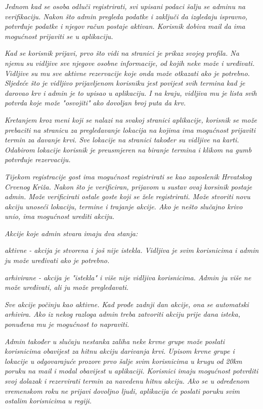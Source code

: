 		\textit{Jednom kad se osoba odluči registrirati, svi upisani podaci šalju se adminu na verifikaciju. Nakon što admin pregleda podatke i zaključi da izgledaju ispravno, potvrđuje podatke i njegov račun postaje aktivan. Korisnik dobiva mail da ima mogućnost prijaviti se u aplikaciju. }

		\textit{Kad se korisnik prijavi, prvo što vidi na stranici je prikaz svojeg profila. Na njemu su vidljive sve njegove osobne informacije, od kojih neke može i uređivati. Vidljive su mu sve aktivne rezervacije koje onda može otkazati ako je potrebno. Sljedeće što je vidljivo prijavljenom korisniku jest povijest svih termina kad je darovao krv i admin je to upisao u aplikaciju. I na kraju, vidljiva mu je lista svih potvrda koje može "osvojiti" ako dovoljan broj puta da krv. }

		\textit{Kretanjem kroz meni koji se nalazi na svakoj stranici aplikacije, korisnik se može prebaciti na stranicu za pregledavanje lokacija na kojima ima mogućnost prijaviti termin za davanje krvi. Sve lokacije na stranici također su vidljive na karti. Odabirom lokacije korisnik je preusmjeren na biranje termina i klikom na gumb potvrđuje rezervaciju. }

		\textit{Tijekom registracije gost ima mogućnost registrirati se kao zaposlenik Hrvatskog Crvenog Križa. Nakon što je verificiran, prijavom u sustav ovaj korsinik postaje admin. Može verificirati ostale goste koji se žele registrirati. Može stvoriti novu akciju unoseći lokaciju, termine i trajanje akcije. Ako je nešto slučajno krivo unio, ima mogućnost urediti akciju. }

		\textit{Akcije koje admin stvara imaju dva stanja:}

		\begin{packed_item}
				\item \textit{aktivne - akcija je stvorena i još nije istekla. Vidljiva je svim korisnicima i admin ju može uređivati ako je potrebno.}
				\item \textit{arhivirane - akcija je "istekla" i više nije vidljiva korisnicima. Admin ju više ne može uređivati, ali ju može pregledavati.}
		\end{packed_item}

		\textit{Sve akcije počinju kao aktivne. Kad prođe zadnji dan akcije, ona se automatski arhivira. Ako iz nekog razloga admin treba zatvoriti akciju prije dana isteka, ponuđena mu je mogućnost to napraviti.}


		\textit{Admin također u slučaju nestanka zaliha neke krvne grupe može poslati korisnicima obavijest za hitnu akciju darivanja krvi. Upisom krvne grupe i lokacije u odgovarajuće prozore prvo šalje svim korisnicima u krugu od 20km poruku na mail i modal obavijest u aplikaciji. Korisnici imaju mogućnost potvrditi svoj dolazak i rezervirati termin za navedenu hitnu akciju. Ako se u određenom vremenskom roku ne prijavi dovoljno ljudi, aplikacija će poslati poruku svim ostalim korisnicima u regiji.}

